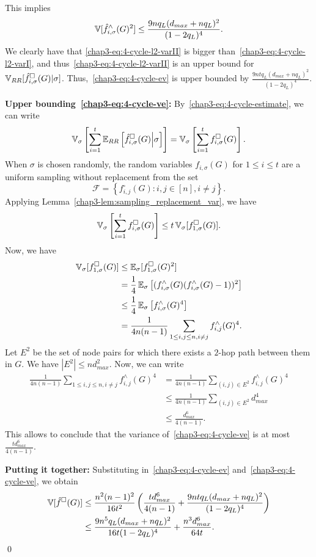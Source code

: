 This implies
\begin{equation}\label{chap3-eq:4-cycle-l2-varII}
  \operatorname{\mathbb{V}}[\hat{f}_{i,\sigma}^\wedge(G)^2] \leq
    \frac{9nq_L(d_{max} + nq_L)^2}{(1-2q_L)^4}.
\end{equation}
We clearly have that \eqref{chap3-eq:4-cycle-l2-varII} is bigger
than~\eqref{chap3-eq:4-cycle-l2-varI}, and thus~\eqref{chap3-eq:4-cycle-l2-varII} is an upper
bound for $\operatorname{\mathbb{V}}_{RR}[\hat{f}_{i,\sigma}^\square(G)|\sigma]$.
Thus,~\eqref{chap3-eq:4-cycle-ev} is upper bounded by
    $\frac{9ntq_L(d_{max} + nq_L)^2}{(1-2q_L)^4}$.

\noindent\textbf{Upper bounding~\eqref{chap3-eq:4-cycle-ve}:}
By~\eqref{chap3-eq:4-cycle-estimate}, we can write
\[
  \operatorname{\mathbb{V}}_\sigma\left[\sum_{i=1}^t \operatorname{\mathbb{E}}_{RR}\left[\hat{f}_{i,\sigma}^\square(G)\middle|
  \sigma \right]\right] = \operatorname{\mathbb{V}}_\sigma\left[\sum_{i=1}^t f_{i,\sigma}^\square(G)\right].
\]
When $\sigma$ is chosen randomly, the random variables $f_{i,\sigma}(G)$
for $1 \leq i \leq t$ are a uniform sampling without replacement from the set \[
\mathcal{F} =
\left\{f_{i,j}^\square(G): i,j \in [n], i\neq j\right\}.
\]
Applying Lemma~\ref{chap3-lem:sampling_replacement_var}, we have
\[
  \operatorname{\mathbb{V}}_\sigma\left[\sum_{i=1}^t f_{i,\sigma}^\square(G)\right]
\leq t \operatorname{\mathbb{V}}_\sigma[ f_{1,\sigma}^\square(G)].
\]
Now, we have
\begin{align*}
  \operatorname{\mathbb{V}}_{\sigma} [f_{1,\sigma}^\square(G)] &\leq
    \operatorname{\mathbb{E}}_{\sigma}[f_{1,\sigma}^\square(G)^2] \\
    &=  \frac{1}{4}\operatorname{\mathbb{E}}_{\sigma}\left[(f_{i,\sigma}^\wedge(G)(f_{i,\sigma}^\wedge(G)-1))^2\right] \\
    &\leq  \frac{1}{4}\operatorname{\mathbb{E}}_{\sigma}\left[f_{i,\sigma}^\wedge(G)^4\right] \\
    &=  \frac{1}{4n(n-1)}\sum_{1 \leq i,j \leq n, i\neq j}f_{i,j}^\wedge(G)^4.
\end{align*}
Let $E^2$ be the set of node pairs for which there exists a $2$-hop path between them in $G$. We have $|E^2| \leq nd_{max}^2$. Now, we can write
\begin{align*}
\frac{1}{4n(n-1)}\sum_{1 \leq i,j \leq n, i\neq j}f_{i,j}^\wedge(G)^4
    &= \frac{1}{4n(n-1)} \sum_{(i,j) \in E^2}f_{i,j}^\wedge(G)^4 \\
    &\leq \frac{1}{4n(n-1)} \sum_{(i,j) \in E^2} d_{max}^4 \\
    &\leq \frac{d_{max}^6}{4(n-1)}.
\end{align*}
This allows to conclude that the variance of~\eqref{chap3-eq:4-cycle-ve} is at most
$\frac{t d_{max}^6}{4(n-1)}$.

\noindent\textbf{Putting it together:}
Substituting in~\eqref{chap3-eq:4-cycle-ev} and~\eqref{chap3-eq:4-cycle-ve}, we obtain
\begin{align*}
    \operatorname{\mathbb{V}}[\hat{f}^\square(G)] &\leq
    \frac{n^2(n-1)^2}{16t^2}\left(\frac{td_{max}^6}{4(n-1)} +
    \frac{9ntq_L(d_{max} + nq_L)^2}{(1-2q_L)^4} \right) \\
    &\leq \frac{9n^5 q_L(d_{max} +
    nq_L)^2}{16t(1-2q_L)^4} + \frac{n^3d_{max}^6}{64t}.
\end{align*}\qed
